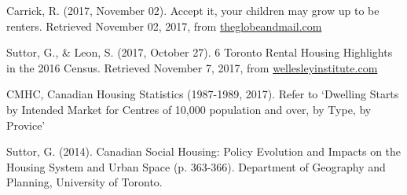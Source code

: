 \begin{thebibliography}{9}
  Carrick, R. (2017, November 02). Accept it, your children may grow up to be renters. Retrieved November 02, 2017, from \href{https://beta.theglobeandmail.com/globe-investor/personal-finance/household-finances/accept-it-your-children-may-grow-up-to-be-renters/article36806999/}{theglobeandmail.com}

  Suttor, G., \& Leon, S. (2017, October 27). 6 Toronto Rental Housing Highlights in the 2016 Census. Retrieved November 7, 2017, from \href{http://www.wellesleyinstitute.com/housing/6-toronto-rental-housing-highlights-in-the-2016-census}{wellesleyinstitute.com}

  CMHC, Canadian Housing Statistics (1987-1989, 2017). Refer to `Dwelling Starts by Intended Market for Centres of 10,000 population and over, by Type, by Provice'

  Suttor, G. (2014). Canadian Social Housing: Policy Evolution and Impacts on the Housing System and Urban Space (p. 363-366). Department of Geography and Planning, University of Toronto.

\end{thebibliography}


